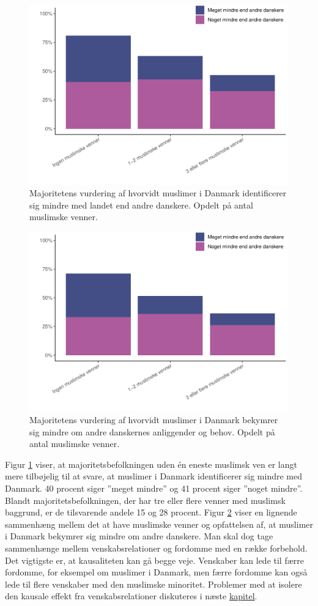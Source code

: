 \documentclass[
]{book}
\begin{document}
\begin{figure}
\includegraphics[width=0.8\linewidth]{en-befolkning-blander-sig_files/figure-latex/fig-6-4-1} \caption{Majoritetens vurdering af hvorvidt muslimer i Danmark identificerer sig mindre med landet end andre danskere. Opdelt på antal muslimske venner.}\label{fig:fig-6-4}
\end{figure}

\begin{figure}
\includegraphics[width=0.8\linewidth]{en-befolkning-blander-sig_files/figure-latex/fig-6-5-1} \caption{Majoritetens vurdering af hvorvidt muslimer i Danmark bekymrer sig mindre om andre danskernes anliggender og behov. Opdelt på antal muslimske venner.}\label{fig:fig-6-5}
\end{figure}

\newpage

Figur \ref{fig:fig-6-4} viser, at majoritetsbefolkningen uden én eneste muslimsk ven er langt mere tilbøjelig til at svare, at muslimer i Danmark identificerer sig mindre med Danmark. 40 procent siger ''meget mindre'' og 41 procent siger ''noget mindre''. Blandt majoritetsbefolkningen, der har tre eller flere venner med muslimsk baggrund, er de tilsvarende andele 15 og 28 procent. Figur \ref{fig:fig-6-5} viser en lignende sammenhæng mellem det at have muslimske venner og opfattelsen af, at muslimer i Danmark bekymrer sig mindre om andre danskere. Man skal dog tage sammenhænge mellem venskabsrelationer og fordomme med en række forbehold. Det vigtigste er, at kausaliteten kan gå begge veje. Venskaber kan lede til færre fordomme, for eksempel om muslimer i Danmark, men færre fordomme kan også lede til flere venskaber med den muslimske minoritet. Problemer med at isolere den kausale effekt fra venskabsrelationer diskuteres i næste \hyperref[kap7]{kapitel}.
\end{document}
